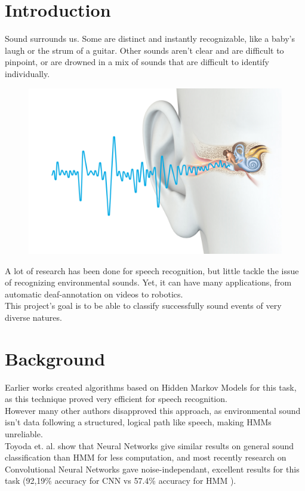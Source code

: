\documentclass[final]{beamer}
\title
[Final Presentation for ML Course, June 13th 2017, Beijing]
{ %
Freesound General-Purpose Audio Tagging Challenge
}
\author{ %
Usama Zafar, Sarah Gross
}
\institute
{
	Tsinghua University, China
}
\date{\today}
\begin{document}
\begin{frame}[t]
\begin{multicols}{3}

\section{Introduction}

	Sound surrounds us. Some are distinct and instantly recognizable, like a baby's laugh or the strum of a guitar. Other sounds aren't clear and are difficult to pinpoint, or are drowned in a mix of sounds that are difficult to identify individually.\\

	\begin{figure}
	\centering
	\includegraphics[width=0.4\columnwidth]{ear_sound.jpg}
	\end{figure}

	A lot of research has been done for speech recognition, but little tackle the issue of recognizing environmental sounds. Yet, it can have many applications, from automatic deaf-annotation on videos to robotics.\\
	This project's goal is to be able to classify successfully sound events of very diverse natures.

\section{Background}

	Earlier works \cite{ref1} \cite{ref2} created algorithms based on Hidden Markov Models for this task, as this technique proved very efficient for speech recognition.\\
	However many other authors \cite{ref3} \cite{ref4} disapproved this approach, as environmental sound isn't data following a structured, logical path like speech, making HMMs unreliable.\\
	Toyoda et. al. \cite{ref5} show that Neural Networks give similar results on general sound classification than HMM for less computation, and most recently research on Convolutional Neural Networks \cite{ref4} \cite{ref6} gave noise-independant, excellent results for this task (92,19\% accuracy for CNN vs 57.4\% accuracy for HMM \cite{ref4}).


\end{multicols}
\end{frame}
\end{document}

